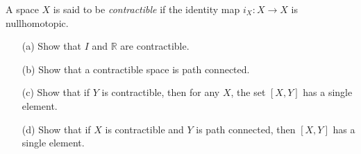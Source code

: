   \begin{exercise}[Munkres 51.3]
    A space $X$ is said to be \textit{contractible} if the identity map $i_X : X \to X$ is nullhomotopic.
    \begin{enumerate}
      \item[(a)] Show that $I$ and $\mathbb{R}$ are contractible.
      \item[(b)] Show that a contractible space is path connected.
      \item[(c)] Show that if $Y$ is contractible, then for any $X$, the set $[X, Y]$ has a single element.
      \item[(d)] Show that if $X$ is contractible and $Y$ is path connected, then $[X, Y]$ has a single element.
    \end{enumerate}
  \end{exercise}
